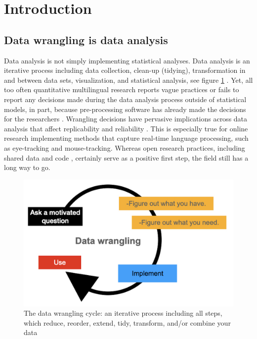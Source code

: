 \section{Introduction}
\subsection{Data wrangling is data analysis}

Data analysis is not simply implementing statistical analyses. Data analysis is an iterative process including data collection, clean-up (tidying), transformation in and between data sets,  visualization, and statistical analysis, see figure \ref{fig:data_wrangling} \parencite{Wickham2017R}. Yet, all too often quantitative multilingual research reports vague practices or fails to report any decisions made during the data analysis process outside of statistical models, in part, because pre-processing software has already made the decisions for the researchers \parencite{Prystauka_Altmann_Rothman_2023}. Wrangling decisions have pervasive implications across data analysis that affect replicability and reliability \parencite{ana_flex}. This is especially true for online research implementing methods that capture real-time language processing, such as eye-tracking and mouse-tracking. Whereas open research practices, including shared data and code \parencite{Bolibaugh}, certainly serve as a positive first step, the field still has a long way to go. 

\begin{figure}[h]
    \centering
    \includegraphics[scale=.3]{figures/data_wrangling.png}
    \caption{The data wrangling cycle: an iterative process including all steps, which reduce, reorder, extend, tidy, transform, and/or combine your data}
    \label{fig:data_wrangling}
\end{figure}

